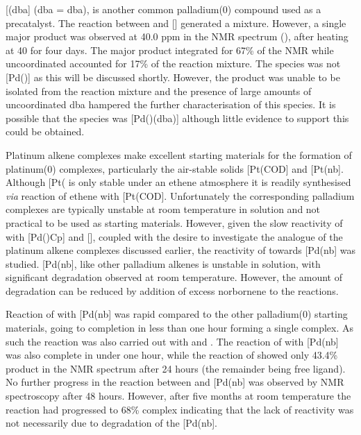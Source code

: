 [(\acrshort{dba}] (\acrshort{dba} = \acrlong{dba}), is another common palladium(0) compound used as a precatalyst.  The reaction between \tBuThixantphos{} and [] generated a mixture.   However, a single major product was observed at 40.0 ppm in the \phosphorus{} NMR spectrum (), after heating at 40\degC{} for four days.  The major product integrated for 67\% of the \phosphorus{} NMR while uncoordinated \tButhixantphos{} accounted for 17\% of the reaction mixture.  The species was not [Pd(\tButhixantphos)] as this will be discussed shortly.  However, the product was unable to be isolated from the reaction mixture and the presence of large amounts of uncoordinated dba hampered the further characterisation of this species.  It is possible that the species was [Pd(\tButhixantphos)(dba)] although little evidence to support this could be obtained.  

Platinum alkene complexes make excellent starting materials for the formation of platinum(0) complexes, particularly the air-stable solids [Pt(COD] and [Pt(nb].  Although [Pt(\ce{C2H4)3]} is only stable under an ethene atmosphere it is readily synthesised  \emph{via} reaction of ethene with [Pt(COD].  Unfortunately the corresponding palladium complexes are typically unstable at room temperature in solution and not practical to be used as starting materials.\cite{Green1977}  However, given the slow reactivity of \tButhixantphos{} with [Pd()Cp] and [], coupled with the desire to investigate the analogue of the platinum alkene complexes discussed earlier,  the reactivity of \tButhixantphos{} towards [Pd(nb] was studied.  [Pd(nb], like other palladium alkenes is unstable in solution, with significant degradation observed at room temperature.  However, the amount of degradation can be reduced by addition of excess norbornene to the reactions.  

Reaction of \tButhixantphos{} with [Pd(nb] was rapid compared to the other palladium(0) starting materials, going to completion in less than one hour forming a single complex.  As such the reaction was also carried out with \tBusixantphos{} and \tBuxantphos{}.  The reaction of \tBuxantphos{} with [Pd(nb] was also complete in under one hour, while the reaction of \tBusixantphos{} showed only 43.4\% product in the \phosphorus{} NMR spectrum after 24 hours (the remainder being free ligand).  No further progress in the reaction between \tBusixantphos{} and [Pd(nb] was observed by NMR spectroscopy after 48 hours.  However, after five months at room temperature the reaction had progressed to 68\% complex indicating that the lack of reactivity was not necessarily due to degradation of the [Pd(nb].  

